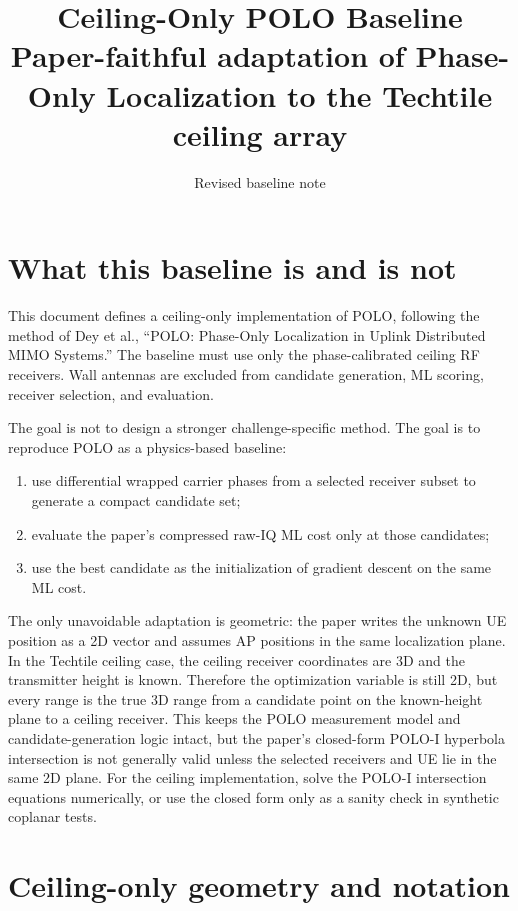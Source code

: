 \documentclass[11pt]{article}
\title{Ceiling-Only POLO Baseline\\\large Paper-faithful adaptation of Phase-Only Localization to the Techtile ceiling array}
\author{Revised baseline note}
\date{}
\begin{document}
\maketitle

\section{What this baseline is and is not}

This document defines a ceiling-only implementation of POLO, following the method of Dey et al., ``POLO: Phase-Only Localization in Uplink Distributed MIMO Systems.'' The baseline must use only the phase-calibrated ceiling RF receivers. Wall antennas are excluded from candidate generation, ML scoring, receiver selection, and evaluation.

The goal is not to design a stronger challenge-specific method. The goal is to reproduce POLO as a physics-based baseline:
\begin{enumerate}[leftmargin=*]
    \item use differential wrapped carrier phases from a selected receiver subset to generate a compact candidate set;
    \item evaluate the paper's compressed raw-IQ ML cost only at those candidates;
    \item use the best candidate as the initialization of gradient descent on the same ML cost.
\end{enumerate}

The only unavoidable adaptation is geometric: the paper writes the unknown UE position as a 2D vector and assumes AP positions in the same localization plane. In the Techtile ceiling case, the ceiling receiver coordinates are 3D and the transmitter height is known. Therefore the optimization variable is still 2D, but every range is the true 3D range from a candidate point on the known-height plane to a ceiling receiver. This keeps the POLO measurement model and candidate-generation logic intact, but the paper's closed-form POLO-I hyperbola intersection is not generally valid unless the selected receivers and UE lie in the same 2D plane. For the ceiling implementation, solve the POLO-I intersection equations numerically, or use the closed form only as a sanity check in synthetic coplanar tests.

\section{Ceiling-only geometry and notation}
\end{document}
